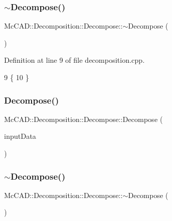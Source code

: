 \subsubsection{\texorpdfstring{$\sim$\+Decompose()}{~Decompose()}\hspace{0.1cm}{\footnotesize\ttfamily [1/2]}}
{\footnotesize\ttfamily Mc\+C\+A\+D\+::\+Decomposition\+::\+Decompose\+::$\sim$\+Decompose (\begin{DoxyParamCaption}{ }\end{DoxyParamCaption})}



Definition at line 9 of file decomposition.\+cpp.


\begin{DoxyCode}
9                                        \{
10 \}
\end{DoxyCode}
\mbox{\label{classMcCAD_1_1Decomposition_1_1Decompose_af2f1861cb1e63cc0523ef59a73f996f4}} 
\subsubsection{\texorpdfstring{Decompose()}{Decompose()}\hspace{0.1cm}{\footnotesize\ttfamily [2/2]}}
{\footnotesize\ttfamily Mc\+C\+A\+D\+::\+Decomposition\+::\+Decompose\+::\+Decompose (\begin{DoxyParamCaption}\item[{const \hyperlink{classMcCAD_1_1General_1_1InputData}{General\+::\+Input\+Data} \&}]{input\+Data }\end{DoxyParamCaption})}

\mbox{\label{classMcCAD_1_1Decomposition_1_1Decompose_a044e46752ce3802e9484a58b82829162}} 
\subsubsection{\texorpdfstring{$\sim$\+Decompose()}{~Decompose()}\hspace{0.1cm}{\footnotesize\ttfamily [2/2]}}
{\footnotesize\ttfamily Mc\+C\+A\+D\+::\+Decomposition\+::\+Decompose\+::$\sim$\+Decompose (\begin{DoxyParamCaption}{ }\end{DoxyParamCaption})}



